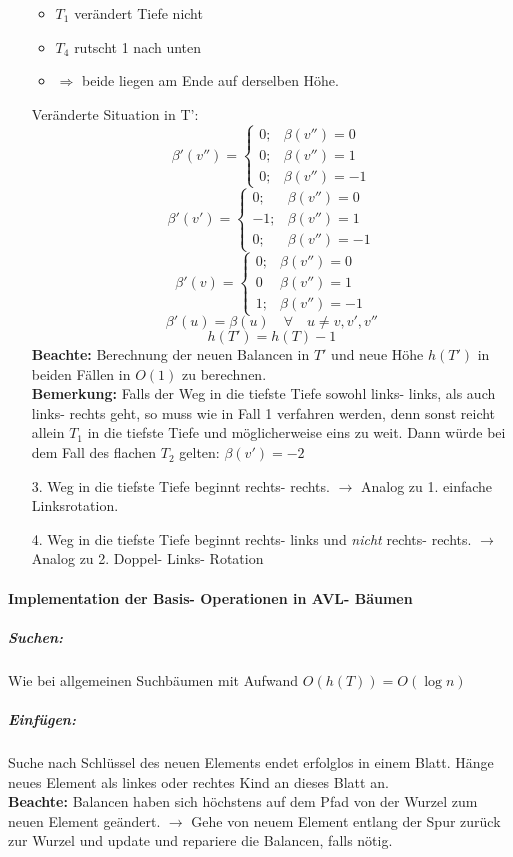 \documentclass[fleqn]{scrartcl}
\begin{document}
\begin{itemize}
\begin{itemize}
\item $T_1$ verändert Tiefe nicht
\item $T_4$ rutscht 1 nach unten
\item $\Rightarrow$ beide liegen am Ende auf derselben Höhe.
\end{itemize}
\subitem Veränderte Situation in T':
\[\beta ' (v'') = \left\{ \begin{array} {ll}
0; & \beta(v'') = 0\\
0; & \beta(v'') = 1\\
0; & \beta (v'') = -1
\end{array}\right.\]
\[\beta ' (v') = \left\{ \begin{array} {ll}
0; & \beta(v'') = 0\\
-1; & \beta(v'') = 1\\
0; & \beta (v'') = -1
\end{array}\right.\]
\[\beta ' (v) = \left\{ \begin{array} {ll}
0; & \beta(v'') = 0\\
0 & \beta(v'') = 1\\
1; & \beta (v'') = -1
\end{array}\right.\]
\[\beta ' (u) = \beta(u) \quad \forall \quad u \neq v, v', v''\]
\[h(T') =h(T) -1 \]
\textbf{Beachte:} Berechnung der neuen Balancen in $T'$ und neue Höhe $h(T')$ in beiden Fällen in $O(1)$ zu berechnen.\\
\textbf{Bemerkung:} Falls der Weg in die tiefste Tiefe sowohl links- links, als auch links- rechts geht, so muss wie in Fall 1 verfahren werden, denn sonst reicht allein $T_1$ in die tiefste Tiefe und möglicherweise eins zu weit. Dann würde bei dem Fall des flachen $T_2$ gelten: $\beta(v') = -2$
\item[3.] Weg in die tiefste Tiefe beginnt rechts- rechts. $\rightarrow$ Analog zu 1. einfache Linksrotation.
\item[4.] Weg in die tiefste Tiefe beginnt rechts- links und \textit{nicht} rechts- rechts. $\rightarrow$ Analog zu 2. Doppel- Links- Rotation
\end{itemize}

\paragraph{Implementation der Basis- Operationen in AVL- Bäumen}
\subparagraph{Suchen:} Wie bei allgemeinen Suchbäumen mit Aufwand $O(h(T)) = O (\log n)$
\subparagraph{Einfügen:} Suche nach Schlüssel des neuen Elements endet erfolglos in einem Blatt. Hänge neues Element als linkes oder rechtes Kind an dieses Blatt an.\\
\textbf{Beachte:} Balancen haben sich höchstens auf dem Pfad von der Wurzel zum neuen Element geändert. $\rightarrow$ Gehe von neuem Element entlang der Spur zurück zur Wurzel und update und repariere die Balancen, falls nötig.
\end{document}
